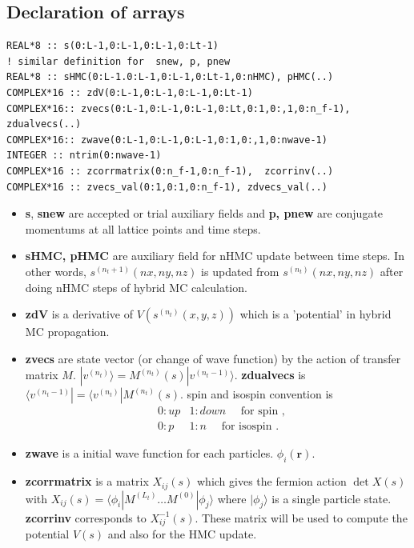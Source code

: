 \documentclass[10pt]{book}
\def\bm{\boldsymbol}
\newcommand{\bea}{\begin{eqnarray}}
\newcommand{\eea}{\end{eqnarray}}
\newcommand{\no}{\nonumber \\}
\def\vr{{\bm r}}
\def\la{\langle}
\def\ra{\rangle}
\begin{document}
\subsection{Declaration of arrays}
\begin{lstlisting}[frame=single]
REAL*8 :: s(0:L-1,0:L-1,0:L-1,0:Lt-1)
! similar definition for  snew, p, pnew
REAL*8 :: sHMC(0:L-1.0:L-1,0:L-1,0:Lt-1,0:nHMC), pHMC(..)
COMPLEX*16 :: zdV(0:L-1,0:L-1,0:L-1,0:Lt-1)
COMPLEX*16:: zvecs(0:L-1,0:L-1,0:L-1,0:Lt,0:1,0:,1,0:n_f-1), zdualvecs(..)
COMPLEX*16:: zwave(0:L-1,0:L-1,0:L-1,0:1,0:,1,0:nwave-1)
INTEGER :: ntrim(0:nwave-1)
COMPLEX*16 :: zcorrmatrix(0:n_f-1,0:n_f-1),  zcorrinv(..)
COMPLEX*16 :: zvecs_val(0:1,0:1,0:n_f-1), zdvecs_val(..) 
\end{lstlisting} 
\begin{itemize} 
\item {\bf s}, {\bf snew} are accepted or trial auxiliary fields and {\bf p, pnew} are
    conjugate momentums at all lattice points and time steps.
\item {\bf sHMC, pHMC} are auxiliary field for nHMC update between time steps.
      In other words, $s^{(n_t+1)}(nx,ny,nz)$ is updated from $s^{(n_t)}(nx,ny,nz)$ 
      after doing nHMC steps of hybrid MC calculation.
\item {\bf zdV} is a derivative of $V(s^{(n_t)}(x,y,z) )$ which is a 'potential'
     in hybrid MC propagation.      
\item {\bf zvecs} are state vector (or change of wave function) by the action of transfer matrix $M$.
      $|v^{(n_t)}\ra= M^{(n_t)}(s)|v^{(n_t-1)}\ra$. {\bf zdualvecs} is
      $\la v^{(n_t-1)}|= \la v^{(n_t)}|M^{(n_t)}(s)$. spin and isospin convention is 
      \bea 
      &0:up & 1:down \quad \mbox{ for spin },\no 
      &0:p  & 1:n \quad  \mbox{ for isospin }. 
      \eea 
\item {\bf zwave} is a initial wave function for each particles. $\phi_{i}(\vr)$.
\item {\bf zcorrmatrix} is a matrix $X_{ij}(s)$ which gives the fermion 
      action $\det X(s)$ with $X_{ij}(s)=\la \phi_i| M^{(L_t)}\dots M^{(0)}|\phi_j\ra$
      where $|\phi_j\ra$ is a single particle state. 
      {\bf zcorrinv} corresponds to $X^{-1}_{ij}(s)$.
      These matrix will be used to compute the potential $V(s)$ and
      also for the HMC update.
      

\end{itemize}
\end{document}
